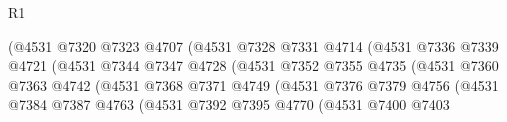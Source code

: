 \begin{lexlean}{R1}
\begin{coremodule}
                                            (@4531
                                              @7320
                                              @7323
                                              @4707
                                              (@4531
                                                @7328
                                                @7331
                                                @4714
                                                (@4531
                                                  @7336
                                                  @7339
                                                  @4721
                                                  (@4531
                                                    @7344
                                                    @7347
                                                    @4728
                                                    (@4531
                                                      @7352
                                                      @7355
                                                      @4735
                                                      (@4531
                                                        @7360
                                                        @7363
                                                        @4742
                                                        (@4531
                                                          @7368
                                                          @7371
                                                          @4749
                                                          (@4531
                                                            @7376
                                                            @7379
                                                            @4756
                                                            (@4531
                                                              @7384
                                                              @7387
                                                              @4763
                                                              (@4531
                                                                @7392
                                                                @7395
                                                                @4770
                                                                (@4531
                                                                  @7400
                                                                  @7403

\end{coremodule}
\end{lexlean}
